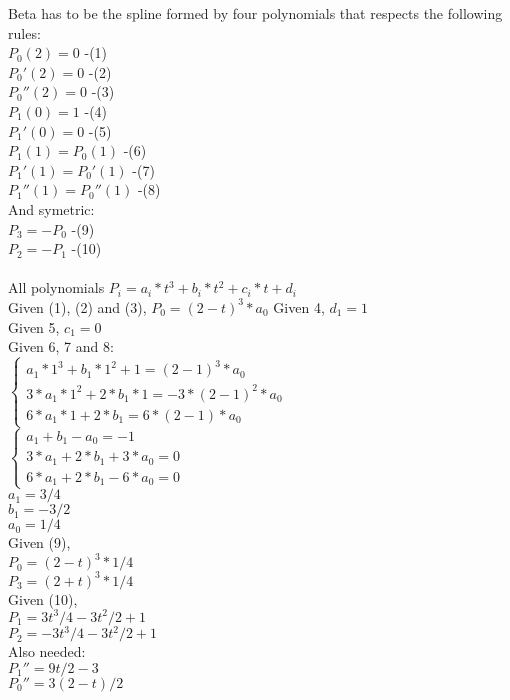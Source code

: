 \documentclass[12pt]{article}
\begin{document}
Beta has to be the spline formed by four polynomials that respects the following rules:\\
$P_0(2) = 0$ -(1)\\
$P_0'(2) = 0$ -(2)\\
$P_0''(2) = 0$ -(3)\\
$P_1(0) = 1$ -(4)\\
$P_1'(0) = 0$ -(5)\\
$P_1(1) = P_0(1)$ -(6)\\
$P_1'(1) = P_0'(1)$ -(7)\\
$P_1''(1) = P_0''(1)$ -(8)\\
And symetric:\\
$P_3 = - P_0$ -(9)\\
$P_2 = - P_1$ -(10)\\
\\
All polynomials $P_i = a_i*t^3 + b_i*t^2 + c_i*t + d_i$\\
Given (1), (2) and (3), $P_0 = (2-t)^3*a_0$
Given 4, $d_1 = 1$\\
Given 5, $c_1 = 0$\\
Given 6, 7 and 8:\\
$
\begin{cases} 
	a_1*1^3 + b_1*1^2 + 1 = (2-1)^3*a_0 \\ 
	3*a_1*1^2 + 2*b_1*1 = -3*(2-1)^2*a_0\\ 
	6*a_1*1 + 2*b_1 = 6*(2-1)*a_0 \end{cases}
$\\
$
\begin{cases} 
	a_1 + b_1 - a_0 = -1 \\ 
	3*a_1 + 2*b_1 + 3*a_0 = 0\\ 
	6*a_1 + 2*b_1 - 6*a_0  = 0\end{cases}
$\\
$a_1 = 3/4$\\
$b_1 = -3/2$\\
$a_0 = 1/4$\\
Given (9),\\
$P_0 = (2-t)^3*1/4$\\
$P_3 = (2+t)^3	*1/4$\\
Given (10),\\
$P_1 = 3t^3/4 - 3t^2/2 + 1$\\
$P_2 = -3t^3/4 - 3t^2/2 + 1$\\
Also needed:\\
$P_1'' = 9t/2 - 3$\\
$P_0'' = 3(2-t)/2$\\
\end{document}
